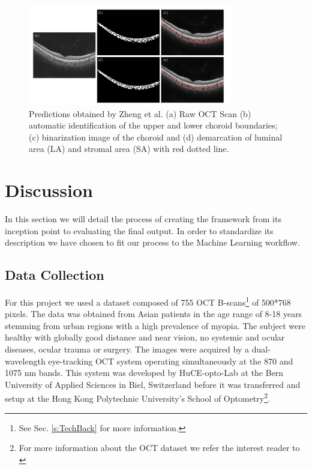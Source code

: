 \documentclass[12pt,a4paper]{scrartcl}
\begin{document}
\begin{figure}[H]
    \centering
    \includegraphics[width=0.8\textwidth]{./images/choroidal-segmentation-zheng.png}
    \caption{Predictions obtained by Zheng et al. (a) Raw OCT Scan (b) automatic identification of the upper and lower choroid boundaries; (c) binarization image of the choroid and (d) demarcation of luminal area (LA) and stromal area (SA) with red dotted line. \cite{Zheng2020}}
\end{figure}





\section{Discussion}\label{s:Discussion}

In this section we will detail the process of creating the framework from its inception point to evaluating the final output. In order to standardize its description we have chosen to fit our process to the Machine Learning workflow. 

\subsection{Data Collection}
For this project we used a dataset composed of 755 OCT B-scans\footnote{See Sec. \ref{s:TechBack} for more information.} of 500*768 pixels. The data was obtained from Asian patients in the age range of 8-18 years stemming from urban regions with a high prevalence of myopia. The subject were healthy with globally good distance and near vision, no systemic and ocular diseases, ocular trauma or surgery\cite{Ronchetti2019}. The images were acquired by a dual-wavelength eye-tracking OCT system operating simultaneously at the 870 and 1075 nm bands. This system was developed by HuCE-opto-Lab at the Bern University of Applied Sciences in Biel, Switzerland \cite{Ronchetti2019}  before it was transferred and setup at the Hong Kong Polytechnic University’s School of Optometry\footnote{For more information about the OCT dataset we refer the interest reader to \cite{Ronchetti2019}}.
\end{document}

